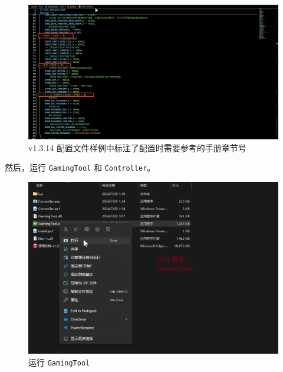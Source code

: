 \begin{figure}[H]
    \Centering
    \includegraphics[width=\textwidth]{docs/assets/update/section_number_in_conf.png}
    \caption{v1.3.14 配置文件样例中标注了配置时需要参考的手册章节号}
    \label{ch5fig-section-number-in-conf}
\end{figure}

然后，运行 \lstinline{GamingTool} 和 \lstinline{Controller}。

\begin{figure}[H]
    \Centering
    \includegraphics[width=\textwidth]{docs/assets/update/run_new_gamingtool.png}
    \caption{运行 \lstinline{GamingTool}}
\end{figure}

